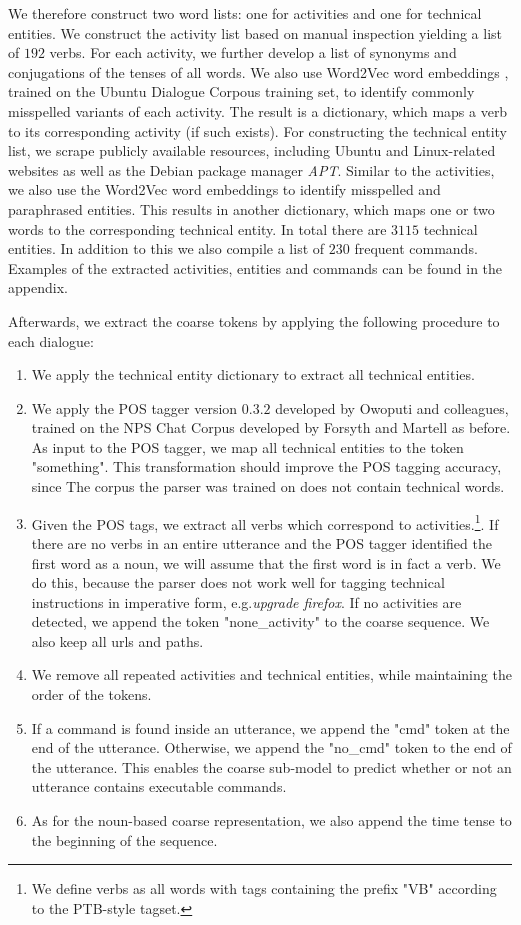 \documentclass{article}
\begin{document}
We therefore construct two word lists: one for activities and one for technical entities. We construct the activity list based on manual inspection yielding a list of $192$ verbs. For each activity, we further develop a list of synonyms and conjugations of the tenses of all words. We also use Word2Vec word embeddings \cite{mikolov2013distributedbetter}, trained on the Ubuntu Dialogue Corpous training set, to identify commonly misspelled variants of each activity. The result is a dictionary, which maps a verb to its corresponding activity (if such exists). For constructing the technical entity list, we scrape publicly available resources, including Ubuntu and Linux-related websites as well as the Debian package manager \textit{APT}. Similar to the activities, we also use the Word2Vec word embeddings to identify misspelled and paraphrased entities. This results in another dictionary, which maps one or two words to the corresponding technical entity. In total there are $3115$ technical entities. In addition to this we also compile a list of $230$ frequent commands. Examples of the extracted activities, entities and commands can be found in the appendix.

Afterwards, we extract the coarse tokens by applying the following procedure to each dialogue:

\begin{enumerate}
\item We apply the technical entity dictionary to extract all technical entities.
\item We apply the POS tagger version $0.3.2$ developed by Owoputi and colleagues, trained on the NPS Chat Corpus developed by Forsyth and Martell as before. As input to the POS tagger, we map all technical entities to the token "something". This transformation should improve the POS tagging accuracy, since The corpus the parser was trained on does not contain technical words.
\item Given the POS tags, we extract all verbs which correspond to activities.\footnote{We define verbs as all words with tags containing the prefix "VB" according to the PTB-style tagset.}. If there are no verbs in an entire utterance and the POS tagger identified the first word as a noun, we will assume that the first word is in fact a verb. We do this, because the parser does not work well for tagging technical instructions in imperative form, e.g.\@ \textit{upgrade firefox}. If no activities are detected, we append the token "none\_activity" to the coarse sequence. We also keep all urls and paths.
\item We remove all repeated activities and technical entities, while maintaining the order of the tokens.
\item If a command is found inside an utterance, we append the "cmd" token at the end of the utterance. Otherwise, we append the "no\_cmd" token to the end of the utterance. This enables the coarse sub-model to predict whether or not an utterance contains executable commands.
\item As for the noun-based coarse representation, we also append the time tense to the beginning of the sequence.
\end{enumerate}
\end{document}
